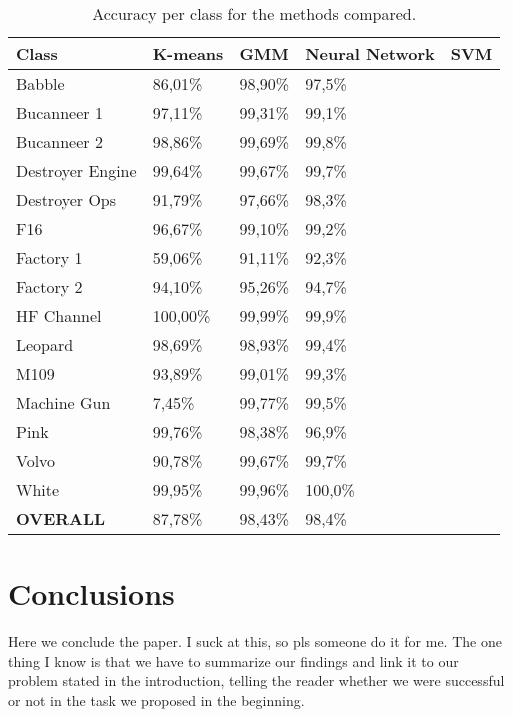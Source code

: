 \documentclass[12pt]{article}
\begin{document}
\begin{table}[ht]
\centering
\caption{Accuracy per class for the methods compared.}
\label{tab:acc}
\begin{tabular}{l|llll}
\hline
Class & K-means & GMM & Neural Network & SVM \\
\hline
Babble & 86,01\% & 98,90\% & 97,5\% & \\
Bucanneer 1 & 97,11\% & 99,31\% & 99,1\% & \\
Bucanneer 2 & 98,86\% & 99,69\% & 99,8\% & \\
Destroyer Engine & 99,64\% & 99,67\% & 99,7\% & \\
Destroyer Ops & 91,79\% & 97,66\% & 98,3\% &\\
F16 & 96,67\% & 99,10\% & 99,2\% &\\
Factory 1 & 59,06\% & 91,11\% & 92,3\% &\\
Factory 2 & 94,10\% & 95,26\% & 94,7\% &\\
HF Channel & 100,00\% & 99,99\% & 99,9\% &\\
Leopard & 98,69\% & 98,93\% & 99,4\% &\\
M109 & 93,89\% & 99,01\% & 99,3\% &\\
Machine Gun & 7,45\% & 99,77\% & 99,5\% &\\
Pink & 99,76\% & 98,38\% & 96,9\% &\\
Volvo & 90,78\% & 99,67\% & 99,7\% &\\
White & 99,95\% & 99,96\% & 100,0\% &\\
\hline
\textbf{OVERALL} & 87,78\% & 98,43\% & 98,4\% & \\
\hline
\end{tabular}
\end{table}



\section{Conclusions} \label{conc}

Here we conclude the paper. I suck at this, so pls someone do it for me. The one thing I know is that we have to summarize our findings and link it to our problem stated in the introduction, telling the reader whether we were successful or not in the task we proposed in the beginning.


\end{document}
